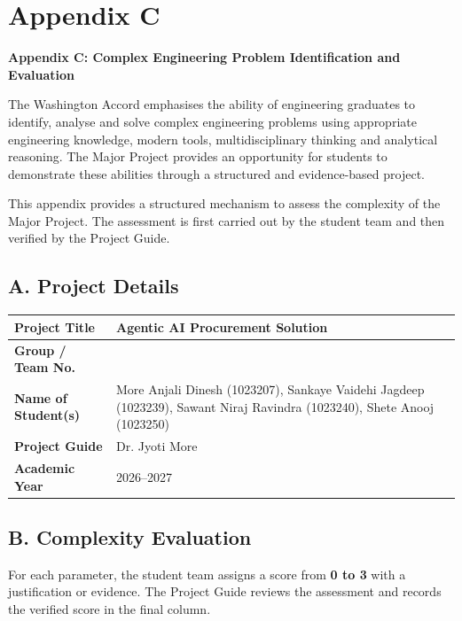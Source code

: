 
\chapter*{Appendix C}

\begin{center}
{\large\bfseries Appendix C: Complex Engineering Problem Identification and Evaluation}
\end{center}

\noindent The Washington Accord emphasises the ability of engineering graduates to identify, analyse and solve complex engineering problems using appropriate engineering knowledge, modern tools, multidisciplinary thinking and analytical reasoning. The Major Project provides an opportunity for students to demonstrate these abilities through a structured and evidence-based project.

\vspace{0.2cm}
\noindent This appendix provides a structured mechanism to assess the complexity of the Major Project. The assessment is first carried out by the student team and then verified by the Project Guide.

\section*{A. Project Details}
\begin{center}
\renewcommand{\arraystretch}{1.35}
\begin{tabularx}{\textwidth}{|L{4.2cm}|Y|}
\hline
\textbf{Project Title} & Agentic AI Procurement Solution \\ \hline
\textbf{Group / Team No.} & \\ \hline
\textbf{Name of Student(s)} & More Anjali Dinesh (1023207), Sankaye Vaidehi Jagdeep (1023239), Sawant Niraj Ravindra (1023240), Shete Anooj (1023250) \\ \hline
\textbf{Project Guide} & Dr. Jyoti More \\ \hline
\textbf{Academic Year} & 2026--2027 \\ \hline
\end{tabularx}
\end{center}

\section*{B. Complexity Evaluation}
\noindent For each parameter, the student team assigns a score from \textbf{0 to 3} with a justification or evidence. The Project Guide reviews the assessment and records the verified score in the final column.

